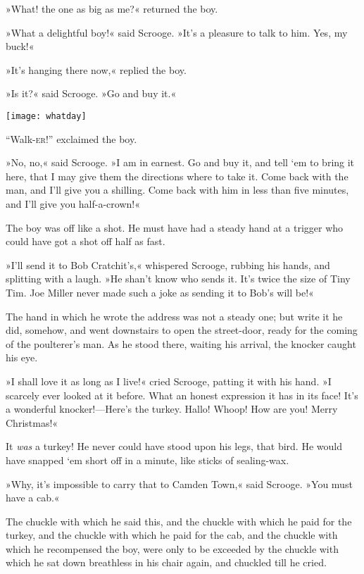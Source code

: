 »What! the one as big as me?« returned the boy.

»What a delightful boy!« said Scrooge. »It's a pleasure to talk to him. Yes, my buck!«

»It's hanging there now,« replied the boy.

»Is it?« said Scrooge. »Go and buy it.«

\begin{center}
\begin{minipage}[c]{\textwidth}
\texttt{[image: whatday]}
\end{minipage}
\end{center}

\enquote{Walk-\textsc{er}!} exclaimed the boy.

»No, no,« said Scrooge. »I am in earnest. Go and buy it, and tell `em to bring it here, that I may give them the directions where to take it. Come back with the man, and I'll give you a shilling. Come back with him in less than five minutes, and I'll give you half-a-crown!«

The boy was off like a shot. He must have had a steady hand at a trigger who could have got a shot off half as fast.

»I'll send it to Bob Cratchit's,« whispered Scrooge, rubbing his hands, and splitting with a laugh. »He shan't know who sends it. It's twice the size of Tiny Tim. Joe Miller never made such a joke as sending it to Bob's will be!«

The hand in which he wrote the address was not a steady one; but write it he did, somehow, and went downstairs to open the street-door, ready for the coming of the poulterer's man. As he stood there, waiting his arrival, the knocker caught his eye.

»I shall love it as long as I live!« cried Scrooge, patting it with his hand. »I scarcely ever looked at it before. What an honest expression it has in its face! It's a wonderful knocker!—Here's the turkey. Hallo! Whoop! How are you! Merry Christmas!«

It \textit{was} a turkey! He never could have stood upon his legs, that bird. He would have snapped `em short off in a minute, like sticks of sealing-wax.

»Why, it's impossible to carry that to Camden Town,« said Scrooge. »You must have a cab.«

The chuckle with which he said this, and the chuckle with which he paid for the turkey, and the chuckle with which he paid for the cab, and the chuckle with which he recompensed the boy, were only to be exceeded by the chuckle with which he sat down breathless in his chair again, and chuckled till he cried.

